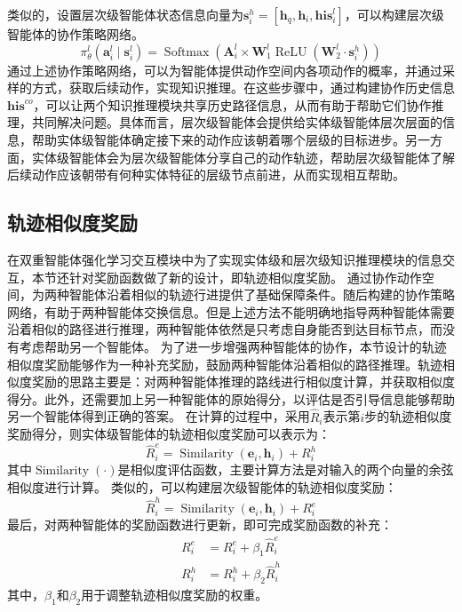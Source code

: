 \documentclass[algorithmlist, AutoFakeBold, AutoFakeSlant, figurelist, tablelist, nomlist, masters]{seuthesix}
\begin{document}
类似的，设置层次级智能体状态信息向量为$\bm{s}_i^{h} = \left[\bm{h}_q, \bm{h}_i, \bm{his}_i^l\right]$，可以构建层次级智能体的协作策略网络。
\begin{equation}
  \pi_\theta^l\left(\bm{a}_i^l \mid \bm{s}_i^l\right) =\operatorname{Softmax}\left(\bm{A}_i^l \times \mathbf{W}_1^l \operatorname{ReLU}\left(\mathbf{W}_2^l \cdot \bm{s}_i^{h}\right)\right)
\end{equation}
通过上述协作策略网络，可以为智能体提供动作空间内各项动作的概率，并通过采样的方式，获取后续动作，实现知识推理。在这些步骤中，通过构建协作历史信息$\bm{his}^{co}$，可以让两个知识推理模块共享历史路径信息，从而有助于帮助它们协作推理，共同解决问题。具体而言，层次级智能体会提供给实体级智能体层次层面的信息，帮助实体级智能体确定接下来的动作应该朝着哪个层级的目标进步。另一方面，实体级智能体会为层次级智能体分享自己的动作轨迹，帮助层次级智能体了解后续动作应该朝带有何种实体特征的层级节点前进，从而实现相互帮助。

\subsection{轨迹相似度奖励}
在双重智能体强化学习交互模块中为了实现实体级和层次级知识推理模块的信息交互，本节还针对奖励函数做了新的设计，即轨迹相似度奖励。
通过协作动作空间，为两种智能体沿着相似的轨迹行进提供了基础保障条件。随后构建的协作策略网络，有助于两种智能体交换信息。但是上述方法不能明确地指导两种智能体需要沿着相似的路径进行推理，两种智能体依然是只考虑自身能否到达目标节点，而没有考虑帮助另一个智能体。
为了进一步增强两种智能体的协作，本节设计的轨迹相似度奖励能够作为一种补充奖励，鼓励两种智能体沿着相似的路径推理。轨迹相似度奖励的思路主要是：对两种智能体推理的路线进行相似度计算，并获取相似度得分。此外，还需要加上另一种智能体的原始得分，以评估是否引导信息能够帮助另一个智能体得到正确的答案。
在计算的过程中，采用$\hat{R}_i$表示第$i$步的轨迹相似度奖励得分，则实体级智能体的轨迹相似度奖励可以表示为：
\begin{equation}
  \hat{R}_i^e = \operatorname{Similarity}(\bm{e}_i, \bm{h}_i) + R_i^h
\end{equation}
其中$\operatorname{Similarity}(\cdot)$是相似度评估函数，主要计算方法是对输入的两个向量的余弦相似度进行计算。
类似的，可以构建层次级智能体的轨迹相似度奖励：
\begin{equation}
  \hat{R}_i^h = \operatorname{Similarity}(\bm{e}_i, \bm{h}_i) + R_i^e
\end{equation}
最后，对两种智能体的奖励函数进行更新，即可完成奖励函数的补充：
\begin{equation}
  \begin{aligned}
    R_i^e &= R_i^e + \beta_1 \hat{R}_i^e \\
    R_i^h &= R_i^h + \beta_2 \hat{R}_i^h
  \end{aligned}
\end{equation}
其中，$\beta_1$和$\beta_2$用于调整轨迹相似度奖励的权重。
\end{document}
